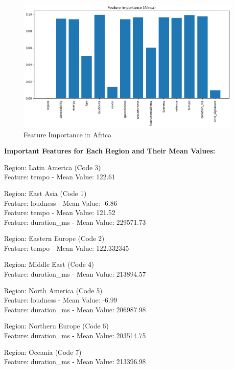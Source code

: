 \begin{figure}[h]
    \centering
    \begin{minipage}{0.45\textwidth}
        \centering
        \includegraphics[width=\linewidth]{media/rf_feature_imp_africa.png}
        \caption{Feature Importance in Africa}
    \end{minipage}
\end{figure}

\textbf{Important Features for Each Region and Their Mean Values:}

Region: Latin America (Code 3)\\
Feature: tempo - Mean Value: 122.61

Region: East Asia (Code 1)\\
Feature: loudness - Mean Value: -6.86\\
Feature: tempo - Mean Value: 121.52\\
Feature: duration\_ms - Mean Value: 229571.73

Region: Eastern Europe (Code 2) \\
Feature: tempo - Mean Value: 122.332345

Region: Middle East (Code 4) \\
Feature: duration\_ms - Mean Value: 213894.57

Region: North America (Code 5) \\
Feature: loudness - Mean Value: -6.99\\
Feature: duration\_ms -  Mean Value: 206987.98

Region: Northern Europe (Code 6) \\
Feature: duration\_ms - Mean Value: 203514.75

Region: Oceania (Code 7) \\
Feature: duration\_ms - Mean Value: 213396.98

